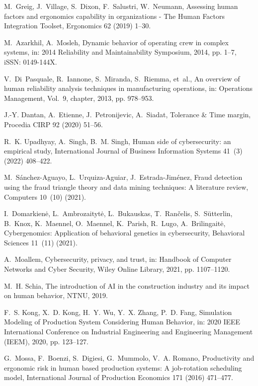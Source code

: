 \documentclass[review,12pt, 3p, times]{elsarticle}
\begin{document}
\begin{thebibliography}{10}
	M.~Greig, J.~Village, S.~Dixon, F.~Salustri, W.~Neumann, Assessing human
	factors and ergonomics capability in organizations - {The} {Human} {Factors}
	{Integration} {Toolset}, Ergonomics 62 (2019) 1--30.
	
	M.~Azarkhil, A.~Mosleh, Dynamic behavior of operating crew in complex systems,
	in: 2014 {Reliability} and {Maintainability} {Symposium}, 2014, pp. 1--7,
	iSSN: 0149-144X.
	
	V.~Di~Pasquale, R.~Iannone, S.~Miranda, S.~Riemma, et~al., An overview of human
	reliability analysis techniques in manufacturing operations, in: Operations
	Management, Vol.~9, chapter, 2013, pp. 978--953.
	
	J.-Y. Dantan, A.~Etienne, J.~Petronijevic, A.~Siadat, Tolerance \& {Time}
	margin, Procedia CIRP 92 (2020) 51--56.
	
	R.~K. Upadhyay, A.~Singh, B.~M. Singh, Human side of cybersecurity: an
	empirical study, International Journal of Business Information Systems 41~(3)
	(2022) 408--422.
	
	M.~S{\'a}nchez-Aguayo, L.~Urquiza-Aguiar, J.~Estrada-Jim{\'e}nez, Fraud
	detection using the fraud triangle theory and data mining techniques: {A}
	literature review, Computers 10~(10) (2021).
	
	I.~Domarkienė, L.~Ambrozaitytė, L.~Bukauskas, T.~Rančelis, S.~Sütterlin,
	B.~Knox, K.~Maennel, O.~Maennel, K.~Parish, R.~Lugo, A.~Brilingaitė,
	Cybergenomics: {Application} of behavioral genetics in cybersecurity,
	Behavioral Sciences 11~(11) (2021).
	
	A.~Moallem, Cybersecurity, privacy, and trust, in: Handbook of Computer
	Networks and Cyber Security, Wiley Online Library, 2021, pp. 1107--1120.
	
	M.~H. Schia, The introduction of AI in the construction industry and its impact
	on human behavior, NTNU, 2019.
	
	F.~S. Kong, X.~D. Kong, H.~Y. Wu, Y.~X. Zhang, P.~D. Fang, Simulation
	{Modeling} of {Production} {System} {Considering} {Human} {Behavior}, in:
	2020 {IEEE} {International} {Conference} on {Industrial} {Engineering} and
	{Engineering} {Management} ({IEEM}), 2020, pp. 123--127.
	
	G.~Mossa, F.~Boenzi, S.~Digiesi, G.~Mummolo, V.~A. Romano, {Productivity and
		ergonomic risk in human based production systems: A job-rotation scheduling
		model}, International Journal of Production Economics 171 (2016) 471--477.
	

\end{thebibliography}
\end{document}
